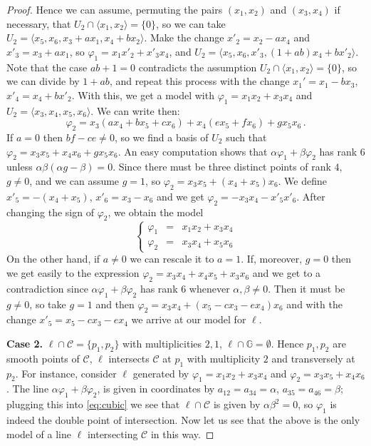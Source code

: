 \documentclass[10pt,reqno]{amsart}
\newcommand{\la}{\langle}
\newcommand{\ra}{\rangle}
\newcommand{\cC}{{\mathcal{C}}}
\newcommand{\GG}{\mathbb{G}}
\renewcommand{\a}{\alpha}
\renewcommand{\b}{\beta}
\newcommand{\f}{\varphi}
\theoremstyle{definition}
\begin{document}
\begin{proof}
\noindent Hence we can assume, permuting the pairs $(x_1,x_2)$ and $(x_3,x_4)$ if necessary, that $U_2 \cap \la x_1,x_2 \ra=\{0\}$, so we can take $U_2=\la x_5,x_6, x_3+ax_1, x_4+bx_2 \ra$. Make the change $x'_2=x_2-ax_4$ and $x'_3=x_3+ax_1$, so $\f_1=x_1x'_2+x'_3x_4$, and $U_2=\la x_5,x_6,x'_3, (1+ab)x_4+bx'_2 \ra$. Note that the case $ab+1=0$ contradicts the assumption $U_2 \cap \la x_1,x_2 \ra=\{0\}$, so we can divide by $1+ab$, and repeat this process with the change $x_1'=x_1-bx_3$, $x'_4=x_4+bx'_2$. With this, we get a model with $\f_1=x_1x_2+x_3x_4$ and $U_2=\la  x_3, x_4, x_5, x_6 \ra$. We can write then:
\[
\f_2=x_3(ax_4+bx_5+cx_6)+x_4(ex_5+fx_6)+gx_5x_6 \, .
\]
If $a=0$ then $bf-ce\neq 0$, so we find a basis of $U_2$ such that $\f_2=x_3x_5+x_4x_6+gx_5x_6$. An easy computation shows that $\a \f_1+ \b \f_2$ has rank $6$ unless $\a\b(\a g-\b)=0$. Since there must be three distinct points of rank $4$, $g \ne 0$, and we can assume $g=1$, so $\f_2=x_3x_5+(x_4+x_5)x_6$. We define $x'_5=-(x_4+x_5)$, $x'_6=x_3-x_6$ and we get $\f_2=-x_3x_4-x'_5x'_6$. After changing the sign of $\f_2$, we obtain the model
\[
\left\{\begin{array}{ccl}
 \f_1 & = & x_1x_2+x_3x_4\\
 \f_2 & = & x_3x_4+x_5x_6
\end{array}\right.
\]
On the other hand, if $a \ne 0$ we can rescale it to $a=1$. If, moreover, $g=0$ then we get easily to the expression $\f_2=x_3x_4+x_4x_5+x_3x_6$ and we get to a contradiction since $\a \f_1 + \b \f_2$ has rank $6$ whenever $\a, \b \ne 0$. Then it must be $g\ne 0$, so take $g=1$ and then $\f_2=x_3x_4+(x_5-cx_3-ex_4)x_6$ and with the change $x'_5=x_5-cx_3-ex_4$ we arrive at our model for $\ell$.

\medskip

\noindent \textbf{Case 2.} $\ell \cap \cC=\{p_1,p_2\}$ with multiplicities $2,1$, $\ell \cap \GG=\emptyset$. 
Hence $p_1,p_2$ are smooth points of $\cC$, $\ell$ intersects $\cC$ at $p_1$ with multiplicity $2$ and transversely at $p_2$. For instance, consider $\ell$ generated by $\f_1=x_1x_2+x_3x_4$ and $\f_2=x_3x_5+x_4x_6$. The line $\a \f_1 +\b  \f_2$, is given in coordinates by $a_{12}=a_{34}=\a$, $a_{35}=a_{46}=\b$; plugging this into \eqref{eq:cubic} we see that $\ell \cap \cC$ is given by $\a \b^2=0$, so $\f_1$ is indeed the double point of intersection. Now let us see that the above is the only model of a line $\ell$ intersecting $\cC$ in this way.


\end{proof}
\end{document}
